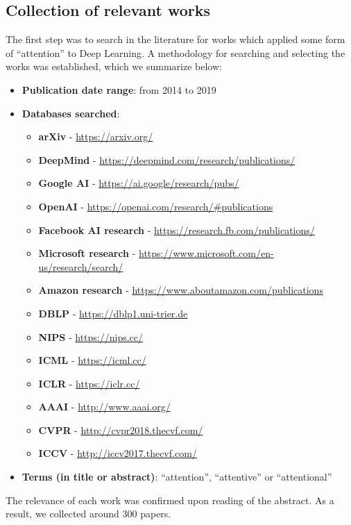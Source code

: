 \documentclass[12pt]{article}
\begin{document}
\subsection{Collection of relevant works}
The first step was to search in the literature for works which applied some form
of ``attention'' to Deep Learning.
A methodology for searching and selecting the works was established,
which we summarize below:

\begin{itemize}
    \item \textbf{Publication date range}: from 2014 to 2019
    \item \textbf{Databases searched}:
    \begin{itemize}
        \item \textbf{arXiv} - \url{https://arxiv.org/}
        \item \textbf{DeepMind} - \url{https://deepmind.com/research/publications/}
        \item \textbf{Google AI} - \url{https://ai.google/research/pubs/}
        \item \textbf{OpenAI} - \url{https://openai.com/research/#publications}
        \item \textbf{Facebook AI research} - \url{https://research.fb.com/publications/}
        \item \textbf{Microsoft research} - \url{https://www.microsoft.com/en-us/research/search/}
        \item \textbf{Amazon research} - \url{https://www.aboutamazon.com/publications}
        \item \textbf{DBLP} - \url{https://dblp1.uni-trier.de}
        \item \textbf{NIPS} - \url{https://nips.cc/}
        \item \textbf{ICML} - \url{https://icml.cc/}
        \item \textbf{ICLR} - \url{https://iclr.cc/}
        \item \textbf{AAAI} - \url{http://www.aaai.org/}
        \item \textbf{CVPR} - \url{http://cvpr2018.thecvf.com/}
        \item \textbf{ICCV} - \url{http://iccv2017.thecvf.com/}
    \end{itemize}
    \item \textbf{Terms (in title or abstract)}: ``attention'',
        ``attentive'' or ``attentional''
\end{itemize}

The relevance of each work was confirmed upon reading of the abstract.
As a result, we collected around 300 papers.
\end{document}
